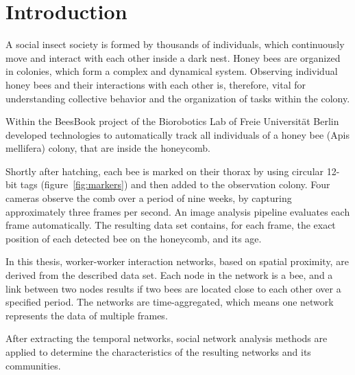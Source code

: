 \chapter{Introduction}
\label{ch:intro}

A social insect society is formed by thousands of individuals, which continuously move and interact with each other inside a dark nest. 
Honey bees are organized in colonies, which form a complex and dynamical system.
Observing individual honey bees and their interactions with each other is, therefore, vital for understanding collective behavior and the organization of tasks within the colony.

Within the BeesBook project of the Biorobotics Lab of Freie Universität Berlin~\textcite{wario2015automatic} developed technologies to automatically track all individuals of a honey bee (Apis mellifera) colony, that are inside the honeycomb.

Shortly after hatching, each bee is marked on their thorax by using circular 12-bit tags (figure~\ref{fig:markers}) and then added to the observation colony. Four cameras observe the comb over a period of nine weeks, by capturing approximately three frames per second. An image analysis pipeline evaluates each frame automatically. The resulting data set contains, for each frame, the exact position of each detected bee on the honeycomb, and its age.

In this thesis, worker-worker interaction networks, based on spatial proximity, are derived from the described data set. Each node in the network is a bee, and a link between two nodes results if two bees are located close to each other over a specified period.
The networks are time-aggregated, which means one network represents the data of multiple frames.

After extracting the temporal networks, social network analysis methods are applied to determine the characteristics of the resulting networks and its communities.

